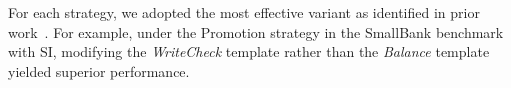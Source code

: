 


For each strategy, we adopted the most effective variant as identified in prior work~\cite{DBLP:conf/aiccsa/AlomariF15}. For example, under the Promotion strategy in the SmallBank benchmark with SI, modifying the \textit{WriteCheck} template rather than the \textit{Balance} template yielded superior performance.  

